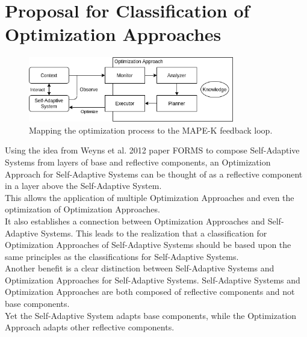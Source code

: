\newpage
\section{Proposal for Classification of Optimization Approaches}
\label{ch:Proposal}


\begin{figure}[t]
    \centering
    \includegraphics[width=0.8\textwidth]{images/ClassificationProposal-OptimizationMAPEK_horizontal.png}
    \caption{Mapping the optimization process to the MAPE-K feedback loop.}
    \label{fig:MappingOptMAPEK}
\end{figure}

Using the idea from Weyns et al. 2012 paper FORMS \cite*{FORMS} to compose Self-Adaptive Systems from
layers of base and reflective components, 
an Optimization Approach for Self-Adaptive Systems can be thought of
as a reflective component in a layer above the Self-Adaptive System. \\
This allows the application of multiple Optimization Approaches and even the 
optimization of Optimization Approaches. \\
It also establishes a connection between Optimization Approaches and Self-Adaptive Systems.
This leads to the realization that a classification for Optimization Approaches of Self-Adaptive Systems
should be based upon the same principles as the classifications for Self-Adaptive Systems. \\
Another benefit is a clear distinction between Self-Adaptive Systems and Optimization Approaches for Self-Adaptive Systems.
Self-Adaptive Systems and Optimization Approaches are both composed of reflective components and not base components. \\
Yet the Self-Adaptive System adapts base components, while the Optimization Approach adapts other reflective components.
\newline
\par


